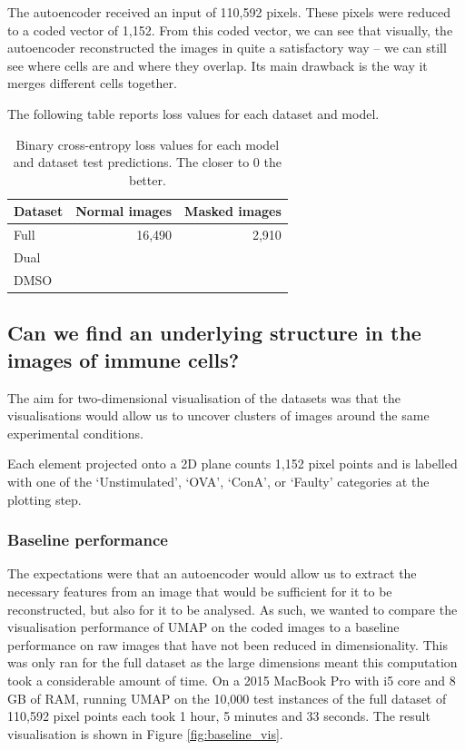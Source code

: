 The autoencoder received an input of 110,592 pixels. These pixels were reduced to a coded vector of 1,152. From this coded vector, we can see that visually, the autoencoder reconstructed the images in quite a satisfactory way – we can still see where cells are and where they overlap. Its main drawback is the way it merges different cells together.

The following table reports loss values for each dataset and model.

\begin{table}[h]
\centering
\caption{Binary cross-entropy loss values for each model and dataset test predictions. The closer to 0 the better.}
\begin{tabular}{|l|r|r|}
\hline
\rowcolor[HTML]{EFEFEF}
Dataset       & Normal images  & Masked images   \\ \hline
Full & 16,490 & 2,910   \\
Dual   &        &    \\
DMSO          &     & \\ \hline
\end{tabular}
\label{table:splits}
\end{table}

\subsection{Can we find an underlying structure in the images of immune cells?}

The aim for two-dimensional visualisation of the datasets was that the visualisations would allow us to uncover clusters of images around the same experimental conditions.

Each element projected onto a 2D plane counts 1,152 pixel points and is labelled with one of the `Unstimulated', `OVA', `ConA', or `Faulty' categories at the plotting step.

\bigskip
\subsubsection{Baseline performance}
\hfill
\hfill

The expectations were that an autoencoder would allow us to extract the necessary features from an image that would be sufficient for it to be reconstructed, but also for it to be analysed. As such, we wanted to compare the visualisation performance of UMAP on the coded images to a baseline performance on raw images that have not been reduced in dimensionality. This was only ran for the full dataset as the large dimensions meant this computation took a considerable amount of time. On a 2015 MacBook Pro with i5 core and 8 GB of RAM, running UMAP on the 10,000 test instances of the full dataset of 110,592 pixel points each took 1 hour, 5 minutes and 33 seconds. The result visualisation is shown in Figure \ref{fig:baseline_vis}.

